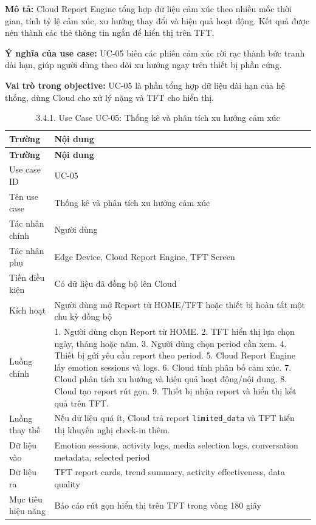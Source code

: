 \documentclass[12pt,a4paper]{article}
\begin{document}
\textbf{Mô tả:} Cloud Report Engine tổng hợp dữ liệu cảm xúc theo nhiều mốc thời gian, tính tỷ lệ cảm xúc, xu hướng thay đổi và hiệu quả hoạt động. Kết quả được nén thành các thẻ thông tin ngắn để hiển thị trên TFT.


\textbf{Ý nghĩa của use case:} UC-05 biến các phiên cảm xúc rời rạc thành bức tranh dài hạn, giúp người dùng theo dõi xu hướng ngay trên thiết bị phần cứng.


\textbf{Vai trò trong objective:} UC-05 là phần tổng hợp dữ liệu dài hạn của hệ thống, dùng Cloud cho xử lý nặng và TFT cho hiển thị.


\begin{center}
\begin{longtable}{|P{0.30\textwidth}|P{0.62\textwidth}|}
\caption{3.4.1. Use Case UC-05: Thống kê và phân tích xu hướng cảm xúc}\\
\hline
\textbf{Trường} & \textbf{Nội dung} \\
\hline
\endfirsthead
\hline
\textbf{Trường} & \textbf{Nội dung} \\
\hline
\endhead
Use case ID & UC-05 \\
\hline
Tên use case & Thống kê và phân tích xu hướng cảm xúc \\
\hline
Tác nhân chính & Người dùng \\
\hline
Tác nhân phụ & Edge Device, Cloud Report Engine, TFT Screen \\
\hline
Tiền điều kiện & Có dữ liệu đã đồng bộ lên Cloud \\
\hline
Kích hoạt & Người dùng mở Report từ HOME/TFT hoặc thiết bị hoàn tất một chu kỳ đồng bộ \\
\hline
Luồng chính & 1. Người dùng chọn Report từ HOME. 2. TFT hiển thị lựa chọn ngày, tháng hoặc năm. 3. Người dùng chọn period cần xem. 4. Thiết bị gửi yêu cầu report theo period. 5. Cloud Report Engine lấy emotion sessions và logs. 6. Cloud tính phân bố cảm xúc. 7. Cloud phân tích xu hướng và hiệu quả hoạt động/nội dung. 8. Cloud tạo report rút gọn. 9. Thiết bị nhận report và hiển thị kết quả trên TFT. \\
\hline
Luồng thay thế & Nếu dữ liệu quá ít, Cloud trả report \texttt{limited\_data} và TFT hiển thị khuyến nghị check-in thêm. \\
\hline
Dữ liệu vào & Emotion sessions, activity logs, media selection logs, conversation metadata, selected period \\
\hline
Dữ liệu ra & TFT report cards, trend summary, activity effectiveness, data quality \\
\hline
Mục tiêu hiệu năng & Báo cáo rút gọn hiển thị trên TFT trong vòng 180 giây \\
\hline
\end{longtable}
\end{center}
\end{document}
